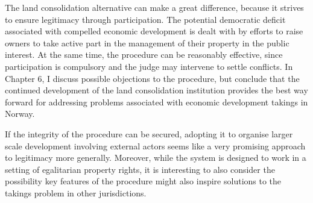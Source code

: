 
The land consolidation alternative can make a great difference, because it strives to ensure legitimacy through participation. The potential democratic deficit associated with compelled economic development is dealt with by efforts to raise owners to take active part in the management of their property in the public interest. At the same time, the procedure can be reasonably effective, since participation is compulsory and the judge may intervene to settle conflicts. In Chapter 6, I discuss possible objections to the procedure, but conclude that the continued development of the land consolidation institution provides the best way forward for addressing problems associated with economic development takings in Norway.


If the integrity of the procedure can be secured, adopting it to organise larger scale development involving external actors seems like a very promising approach to legitimacy more generally. Moreover, while the system is designed to work in a setting of egalitarian property rights, it is interesting to also consider the possibility key features of the procedure might also inspire solutions to the takings problem in other jurisdictions. %

